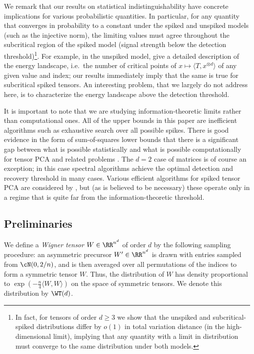 \documentclass{article}
\begin{document}
We remark that our results on statistical indistinguishability have concrete implications for various probabilistic quantities. In particular, for any quantity that converges in probability to a constant under the spiked and unspiked models (such as the injective norm), the limiting values must agree throughout the subcritical region of the spiked model (signal strength below the detection threshold)\footnote{In fact, for tensors of order $d \ge 3$ we show that the unspiked and subcritical-spiked distributions differ by $o(1)$ in total variation distance (in the high-dimensional limit), implying that any quantity with a limit in distribution must converge to the same distribution under both models.}. For example, in the unspiked model, \cite{abac,subag-pspin} give a detailed description of the energy landscape, i.e.\ the number of critical points of $x \mapsto \langle T, x^{\otimes d} \rangle$ of any given value and index; our results immediately imply that the same is true for subcritical spiked tensors. An interesting problem, that we largely do not address here, is to characterize the energy landscape above the detection threshold.

It is important to note that we are studying information-theoretic limits rather than computational ones. All of the upper bounds in this paper are inefficient algorithms such as exhaustive search over all possible spikes. There is good evidence in the form of sum-of-squares lower bounds that there is a significant gap between what is possible statistically and what is possible computationally for tensor PCA and related problems \cite{sos-tensor,sos-clique}. The $d=2$ case of matrices is of course an exception; in this case spectral algorithms achieve the optimal detection and recovery threshold in many cases. Various efficient algorithms for spiked tensor PCA are considered by \cite{rm}, but (as is believed to be necessary) these operate only in a regime that is quite far from the information-theoretic threshold.




\subsection{Preliminaries}

\begin{definition}
\label{def:wig-tensor}
We define a \emph{Wigner tensor} $W \in \RR^{n^d}$ of order $d$ by the following sampling procedure: an asymmetric precursor $W' \in \RR^{n^d}$ is drawn with entries sampled \iid from $\cN(0,2/n)$, and is then averaged over all permutations of the indices to form a symmetric tensor $W$. Thus, the distribution of $W$ has density proportional to $\exp(-\frac{n}{4} \langle W,W \rangle)$ on the space of symmetric tensors. We denote this distribution by $\WT(d)$.
\end{definition}
\end{document}
